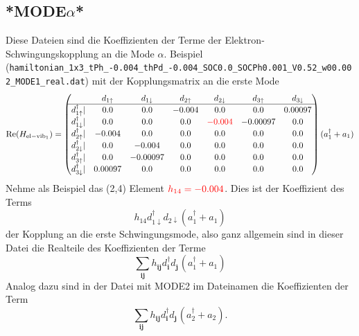 \documentclass{article}
\renewcommand{\vec}[1]{\mathbf{#1}}
\newcommand{\pdagger}{{\phantom{\dagger}}}
\begin{document}
\subsection{*MODE$\alpha$*}
Diese Dateien sind die Koeffizienten der Terme der Elektron-Schwingungskopplung an die Mode $\alpha$. Beispiel (\texttt{hamiltonian\_1x3\_tPh\_-0.004\_thPd\_-0.004\_SOC0.0\_SOCPh0.001\_V0.52\_w00.002\_MODE1\_real.dat}) mit der Kopplungsmatrix an die erste Mode
\begin{equation}
	\mathrm{Re}(H_\mathrm{el-vib_1}) = \begin{pmatrix}
		& d_{1\uparrow} & d_{1\downarrow} & d_{2\uparrow} & d_{2\downarrow} & d_{3\uparrow} & d_{3\downarrow}\\ \hline
			d_{1\uparrow}^\dagger | & 0.0 &     0.0    & -0.004 &   0.0  &   0.0&    0.00097\\
			d_{1\downarrow}^\dagger | & 0.0   &  0.0    & 0.0    & {\color{red}-0.004} &   -0.00097 &  0.0\\
			d_{2\uparrow}^\dagger |& -0.004 &   0.0   &  0.0   &  0.0  &   0.0   &  0.0\\
			d_{2\downarrow}^\dagger |& 0.0    & -0.004&  0.0   &  0.0    & 0.0    & 0.0\\
			d_{3\uparrow}^\dagger |& 0.0    & -0.00097 &  0.0  &   0.0 &    0.0 &    0.0\\
			d_{3\downarrow}^\dagger |& 0.00097 & 0.0   &  0.0    & 0.0 &    0.0 &    0.0
	\end{pmatrix}(a_1^\dagger + a_1)
\end{equation}
Nehme als Beispiel das (2,4) Element ${\color{red} h_{14} = -0.004}$. Dies ist der Koeffizient des Terms 
\begin{equation}
	h_{14} d_{1\downarrow}^\dagger d_{2\downarrow} (a_1^\dagger + a_1)
\end{equation}
der Kopplung an die erste Schwingungsmode, also ganz allgemein sind in dieser Datei die Realteile des Koeffizienten der Terme 
\begin{equation}
	\sum_{\vec{i}\vec{j}} h_{\vec{i}\vec{j}}^\pdagger d_\vec{i}^\dagger d_\vec{j}^\pdagger(a_1^\dagger + a_1)
\end{equation}
Analog dazu sind in der Datei mit MODE2 im Dateinamen die Koeffizienten der Term
\begin{equation}
	\sum_{\vec{i}\vec{j}} h_{\vec{i}\vec{j}}^\pdagger d_\vec{i}^\dagger d_\vec{j}^\pdagger(a_2^\dagger + a_2).
\end{equation}
\end{document}
